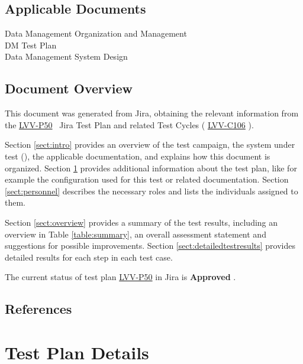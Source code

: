 \documentclass[DM,lsstdraft,STR,toc]{lsstdoc}
\begin{document}
\subsection{Applicable Documents}\label{applicable-documents}

 Data Management Organization and Management\\
 DM Test Plan\\
 Data Management System Design\\[2\baselineskip]


\subsection{Document Overview}
\label{sect:docoverview}

This document was generated from Jira, obtaining the relevant information from the
\href{https://jira.lsstcorp.org/secure/Tests.jspa\#/testPlan/LVV-P50}{LVV-P50}
~Jira Test Plan and related Test Cycles (
\href{https://jira.lsstcorp.org/secure/Tests.jspa\#/testCycle/LVV-C106}{LVV-C106}
).

Section \ref{sect:intro} provides an overview of the test campaign, the system under test (\product{}),
the applicable documentation, and explains how this document is organized.
Section \ref{sect:testplan} provides additional information about the test plan, like for example the configuration
used for this test or related documentation.
Section \ref{sect:personnel} describes the necessary roles and lists the individuals assigned to them.

Section \ref{sect:overview} provides a summary of the test results, including an overview in Table \ref{table:summary},
an overall assessment statement and suggestions for possible improvements.
Section \ref{sect:detailedtestresults} provides detailed results for each step in each test case.

The current status of test plan \href{https://jira.lsstcorp.org/secure/Tests.jspa\#/testPlan/LVV-P50}{LVV-P50} in Jira is \textbf{ Approved }.

\subsection{References}
\label{sect:references}
\renewcommand{\refname}{}



\newpage
\section{Test Plan Details}
\label{sect:testplan}
\end{document}
